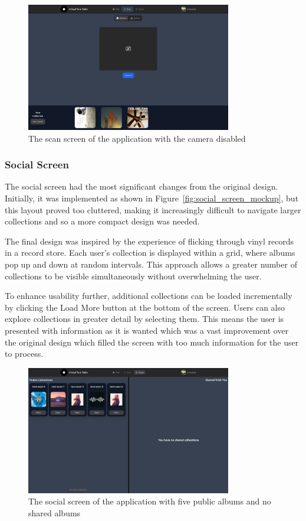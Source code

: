 \begin{figure} [H]
    \centering
    \includegraphics[width=0.8\textwidth]{figures/scan_screen.png}
    \caption{The scan screen of the application with the camera disabled}
    \label{fig:scan_screen}
\end{figure}

\subsubsection{Social Screen}
The social screen had the most significant changes from the original design. Initially, it was implemented as shown in Figure~\ref{fig:social_screen_mockup}, but this layout proved too cluttered, making it increasingly difficult to navigate larger collections and so a more compact design was needed.

The final design was inspired by the experience of flicking through vinyl records in a record store. Each user's collection is displayed within a grid, where albums pop up and down at random intervals. This approach allows a greater number of collections to be visible simultaneously without overwhelming the user.

To enhance usability further, additional collections can be loaded incrementally by clicking the Load More button at the bottom of the screen. Users can also explore collections in greater detail by selecting them. This means the user is presented with information as it is wanted which was a vast improvement over the original design which filled the screen with too much information for the user to process.

\begin{figure} [H]
    \centering
    \includegraphics[width=0.8\textwidth]{figures/social_screen.png}
    \caption{The social screen of the application with five public albums and no shared albums}
    \label{fig:social screen}
\end{figure}

